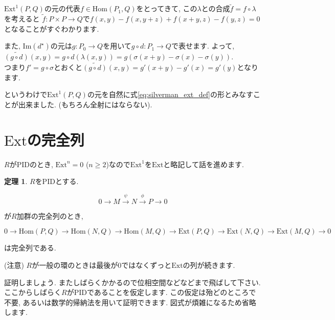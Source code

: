 \documentclass{jsarticle}
\def\Im{\mathrm{Im}}
\def\Hom{\mathrm{Hom}}
\def\Ext{\mathrm{Ext}}
\theoremstyle{definition}
\newtheorem{theorem}{定理}
\numberwithin{theorem}{section}
\begin{document}
$\Ext^1(P, Q)$の元の代表$f\in\Hom(P_1, Q)$をとってきて, この$\lambda$との合成$\tilde{f} = f\circ\lambda$を考えると
$\tilde{f} : P \times P \rightarrow Q$で$f(x, y) - f(x, y+z) + f(x+y, z) - f(y, z) = 0$となることがすぐわかります.

また, $\Im(d^\star)$の元は$g: P_0 \rightarrow Q$を用いて$g\circ d: P_1 \rightarrow Q$で表せます. よって,
$\tilde{(g\circ d)} (x, y) = g\circ d(\lambda(x, y)) = g(\sigma(x+y) - \sigma(x) - \sigma(y))$.\\
つまり$f' = g\circ\sigma$とおくと$\tilde{(g\circ d)}(x, y) = g'(x+y) - g'(x) = g'(y)$となります. 

というわけで$\Ext^1(P, Q)$の元を自然に式\ref{eq:silverman_ext_def}の形とみなすことが出来ました. (もちろん全射にはならない).

\section{$\Ext$の完全列}
$R$がPIDのとき, $\Ext^n = 0$ ($n \geq 2$)なので$\Ext^1$を$\Ext$と略記して話を進めます.

\begin{theorem}
$R$をPIDとする.

\begin{equation*}
0 \rightarrow M \xrightarrow{\psi} N \xrightarrow{\phi} P \rightarrow 0
\end{equation*}

が$R$加群の完全列のとき, 

\begin{equation*}
0 \rightarrow \Hom(P, Q) \rightarrow \Hom(N, Q) \rightarrow \Hom(M, Q) \rightarrow
\Ext(P, Q) \rightarrow \Ext(N, Q) \rightarrow \Ext(M, Q) \rightarrow 0
\end{equation*}

は完全列である.
\end{theorem}

(注意) $R$が一般の環のときは最後が$0$ではなくずっと$\Ext$の列が続きます.

証明しましょう. またしばらくかかるので位相空間などなどまで飛ばして下さい. ここからしばらく$R$がPIDであることを仮定します.
この仮定は殆どのところで不要, あるいは数学的帰納法を用いて証明できます. 図式が煩雑になるため省略します.
\end{document}
